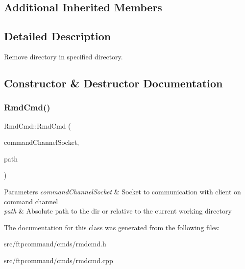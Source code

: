 \subsection*{Additional Inherited Members}


\subsection{Detailed Description}
Remove directory in specified directory. 

\subsection{Constructor \& Destructor Documentation}
\mbox{\label{classRmdCmd_a1a6b462f1eb60b5db2cd469bf3a673a1}} 
\subsubsection{\texorpdfstring{Rmd\+Cmd()}{RmdCmd()}}
{\footnotesize\ttfamily Rmd\+Cmd\+::\+Rmd\+Cmd (\begin{DoxyParamCaption}\item[{int}]{command\+Channel\+Socket,  }\item[{const Q\+String \&}]{path }\end{DoxyParamCaption})}


\begin{DoxyParams}{Parameters}
{\em command\+Channel\+Socket} & Socket to communication with client on command channel \\
\hline
{\em path} & Absolute path to the dir or relative to the current working directory \\
\hline
\end{DoxyParams}


The documentation for this class was generated from the following files\+:\begin{DoxyCompactItemize}
\item 
src/ftpcommand/cmds/rmdcmd.\+h\item 
src/ftpcommand/cmds/rmdcmd.\+cpp\end{DoxyCompactItemize}
